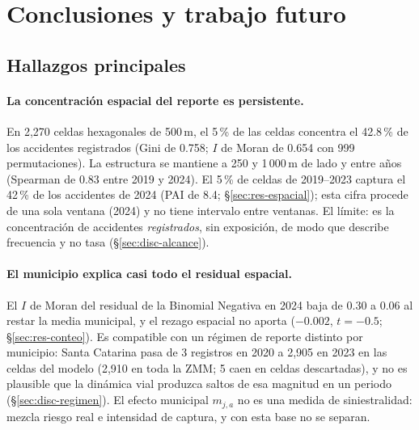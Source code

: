 \section{Conclusiones y trabajo futuro}\label{sec:conclusiones}

\subsection{Hallazgos principales}

\paragraph{La concentración espacial del reporte es persistente.} En 2,270
celdas hexagonales de 500\,m, el 5\,\% de las celdas concentra el 42.8\,\% de
los accidentes registrados (Gini de 0.758; $I$ de Moran de 0.654 con 999
permutaciones). La estructura se mantiene a 250 y 1\,000\,m de lado y entre años
(Spearman de 0.83 entre 2019 y 2024). El 5\,\% de celdas de 2019--2023
captura el 42\,\% de los accidentes de 2024 (PAI de 8.4;
§\ref{sec:res-espacial}); esta cifra procede de una sola ventana (2024) y no
tiene intervalo entre ventanas. El límite: es la concentración de accidentes
\emph{registrados}, sin exposición, de modo que describe frecuencia y no tasa
(§\ref{sec:disc-alcance}).

\paragraph{El municipio explica casi todo el residual espacial.} El $I$ de
Moran del residual de la Binomial Negativa en 2024 baja de 0.30 a 0.06 al
restar la media municipal, y el rezago espacial no aporta ($-0.002$,
$t = -0.5$; §\ref{sec:res-conteo}). Es compatible con un régimen de reporte
distinto por municipio: Santa Catarina pasa de 3 registros en 2020 a 2,905 en
2023 en las celdas del modelo (2,910 en toda la ZMM; 5 caen en celdas
descartadas), y no es plausible que la dinámica vial produzca saltos de esa
magnitud en un periodo (§\ref{sec:disc-regimen}). El efecto municipal
$m_{j,a}$ no es una medida de siniestralidad: mezcla riesgo real e intensidad
de captura, y con esta base no se separan.

